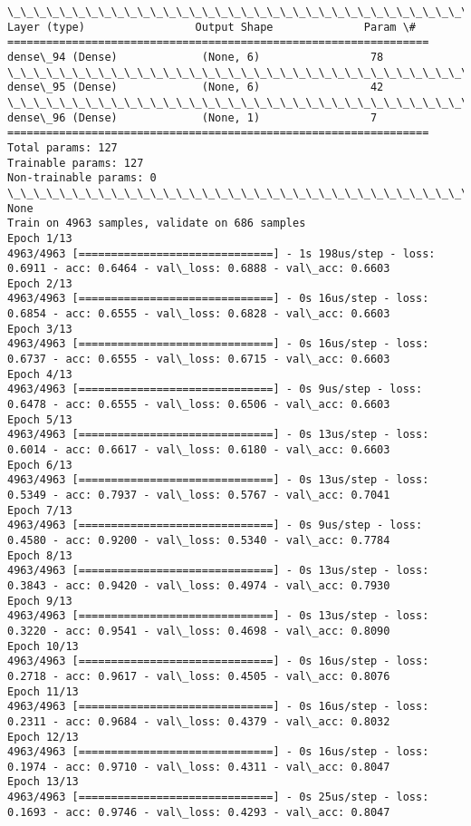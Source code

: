 \documentclass[11pt]{article}
\begin{document}
    \begin{Verbatim}[commandchars=\\\{\}]
\_\_\_\_\_\_\_\_\_\_\_\_\_\_\_\_\_\_\_\_\_\_\_\_\_\_\_\_\_\_\_\_\_\_\_\_\_\_\_\_\_\_\_\_\_\_\_\_\_\_\_\_\_\_\_\_\_\_\_\_\_\_\_\_\_
Layer (type)                 Output Shape              Param \#   
=================================================================
dense\_94 (Dense)             (None, 6)                 78        
\_\_\_\_\_\_\_\_\_\_\_\_\_\_\_\_\_\_\_\_\_\_\_\_\_\_\_\_\_\_\_\_\_\_\_\_\_\_\_\_\_\_\_\_\_\_\_\_\_\_\_\_\_\_\_\_\_\_\_\_\_\_\_\_\_
dense\_95 (Dense)             (None, 6)                 42        
\_\_\_\_\_\_\_\_\_\_\_\_\_\_\_\_\_\_\_\_\_\_\_\_\_\_\_\_\_\_\_\_\_\_\_\_\_\_\_\_\_\_\_\_\_\_\_\_\_\_\_\_\_\_\_\_\_\_\_\_\_\_\_\_\_
dense\_96 (Dense)             (None, 1)                 7         
=================================================================
Total params: 127
Trainable params: 127
Non-trainable params: 0
\_\_\_\_\_\_\_\_\_\_\_\_\_\_\_\_\_\_\_\_\_\_\_\_\_\_\_\_\_\_\_\_\_\_\_\_\_\_\_\_\_\_\_\_\_\_\_\_\_\_\_\_\_\_\_\_\_\_\_\_\_\_\_\_\_
None
Train on 4963 samples, validate on 686 samples
Epoch 1/13
4963/4963 [==============================] - 1s 198us/step - loss: 0.6911 - acc: 0.6464 - val\_loss: 0.6888 - val\_acc: 0.6603
Epoch 2/13
4963/4963 [==============================] - 0s 16us/step - loss: 0.6854 - acc: 0.6555 - val\_loss: 0.6828 - val\_acc: 0.6603
Epoch 3/13
4963/4963 [==============================] - 0s 16us/step - loss: 0.6737 - acc: 0.6555 - val\_loss: 0.6715 - val\_acc: 0.6603
Epoch 4/13
4963/4963 [==============================] - 0s 9us/step - loss: 0.6478 - acc: 0.6555 - val\_loss: 0.6506 - val\_acc: 0.6603
Epoch 5/13
4963/4963 [==============================] - 0s 13us/step - loss: 0.6014 - acc: 0.6617 - val\_loss: 0.6180 - val\_acc: 0.6603
Epoch 6/13
4963/4963 [==============================] - 0s 13us/step - loss: 0.5349 - acc: 0.7937 - val\_loss: 0.5767 - val\_acc: 0.7041
Epoch 7/13
4963/4963 [==============================] - 0s 9us/step - loss: 0.4580 - acc: 0.9200 - val\_loss: 0.5340 - val\_acc: 0.7784
Epoch 8/13
4963/4963 [==============================] - 0s 13us/step - loss: 0.3843 - acc: 0.9420 - val\_loss: 0.4974 - val\_acc: 0.7930
Epoch 9/13
4963/4963 [==============================] - 0s 13us/step - loss: 0.3220 - acc: 0.9541 - val\_loss: 0.4698 - val\_acc: 0.8090
Epoch 10/13
4963/4963 [==============================] - 0s 16us/step - loss: 0.2718 - acc: 0.9617 - val\_loss: 0.4505 - val\_acc: 0.8076
Epoch 11/13
4963/4963 [==============================] - 0s 16us/step - loss: 0.2311 - acc: 0.9684 - val\_loss: 0.4379 - val\_acc: 0.8032
Epoch 12/13
4963/4963 [==============================] - 0s 16us/step - loss: 0.1974 - acc: 0.9710 - val\_loss: 0.4311 - val\_acc: 0.8047
Epoch 13/13
4963/4963 [==============================] - 0s 25us/step - loss: 0.1693 - acc: 0.9746 - val\_loss: 0.4293 - val\_acc: 0.8047

    \end{Verbatim}
\end{document}
